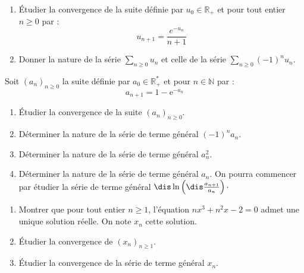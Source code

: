 \documentclass[a4paper,10pt]{report}
\newcommand{\Sum}[2]{\ensuremath{\textstyle{\sum\limits_{#1}^{#2}}}}
\begin{document}
\medskip

\begin{Exa}  
\begin{enumerate}
\item Étudier la convergence de la suite définie par $u_0 \in \mathbb{R}_+$ et pour tout entier $n \geq 0$ par :
 \[
u_{n + 1} = \frac{e^{ - u_n}}{n + 1}
 \]
\item Donner la nature de la série $\Sum{n \geq 0}{} u_n$ et celle de la série $\Sum{n \geq 0}{} (-1)^n u_n$.
\end{enumerate}
\end{Exa}



\begin{Exa} Soit $(a_n )_{n \geq 0} $ la suite d\'efinie par $a_0  \in \mathbb{R}^{*}_+$ et pour $n \in \mathbb{N}$ par :
$$a_{n + 1}  = 1 - {\mathrm{e}}^{ - a_n } $$
\begin{enumerate}
	\item Étudier la convergence de la suite $(a_n )_{n \geq 0}$.
	
\item D\'eterminer la nature de la s\'erie de terme g\'en\'eral $( - 1)^n a_n.$
	
	\item D\'eterminer la nature de la s\'erie de terme g\'en\'eral $a_n^2 $.
	
	\item  D\'eterminer la nature de la s\'erie de terme g\'en\'eral $a_n $. On pourra commencer par étudier la s\'erie de terme général $\dis \ln \left( {\dis\frac{{a_{n + 1} }}{{a_n }}} \right) \cdot$
\end{enumerate}
\end{Exa}



\begin{Exa}[\ding{80}]
\begin{enumerate}
\item Montrer que pour tout entier $n \geq 1$, l'équation $nx^3+n^2x-2=0$ admet une unique solution réelle. On note $x_n$ cette solution.
\item Étudier la convergence de $(x_n)_{n \geq 1}$.
\item Étudier la convergence de la série de terme général $x_n$.
\end{enumerate}
\end{Exa}
\end{document}

